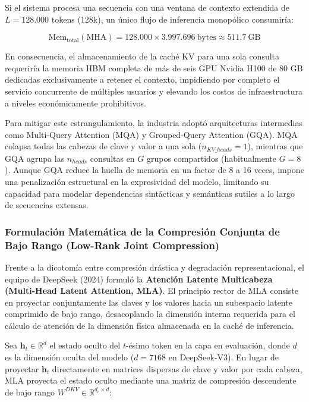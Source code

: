Si el sistema procesa una secuencia con una ventana de contexto extendida de $L = 128.000$ tokens (128k), un único flujo de inferencia monopólico consumiría:

\begin{equation}
\mathrm{Mem}_{\mathrm{total}}(\mathrm{MHA}) = 128.000 \times 3.997.696\ \mathrm{bytes} \approx 511.7\ \mathrm{GB}
\end{equation}

En consecuencia, el almacenamiento de la caché KV para una sola consulta requeriría la memoria HBM completa de más de seis GPU Nvidia H100 de 80 GB dedicadas exclusivamente a retener el contexto, impidiendo por completo el servicio concurrente de múltiples usuarios y elevando los costos de infraestructura a niveles económicamente prohibitivos.

Para mitigar este estrangulamiento, la industria adoptó arquitecturas intermedias como Multi-Query Attention (MQA) y Grouped-Query Attention (GQA). MQA colapsa todas las cabezas de clave y valor a una sola ($n_{KV\_heads} = 1$), mientras que GQA agrupa las $n_{heads}$ consultas en $G$ grupos compartidos (habitualmente $G=8$). Aunque GQA reduce la huella de memoria en un factor de 8 a 16 veces, impone una penalización estructural en la expresividad del modelo, limitando su capacidad para modelar dependencias sintácticas y semánticas sutiles a lo largo de secuencias extensas.

\subsubsection{Formulación Matemática de la Compresión Conjunta de Bajo Rango (Low-Rank Joint Compression)}

Frente a la dicotomía entre compresión drástica y degradación representacional, el equipo de DeepSeek (2024) formuló la \textbf{Atención Latente Multicabeza (Multi-Head Latent Attention, MLA)}. El principio rector de MLA consiste en proyectar conjuntamente las claves y los valores hacia un subespacio latente comprimido de bajo rango, desacoplando la dimensión interna requerida para el cálculo de atención de la dimensión física almacenada en la caché de inferencia.

Sea $\mathbf{h}_t \in \mathbb{R}^d$ el estado oculto del $t$-ésimo token en la capa en evaluación, donde $d$ es la dimensión oculta del modelo ($d = 7168$ en DeepSeek-V3). En lugar de proyectar $\mathbf{h}_t$ directamente en matrices dispersas de clave y valor por cada cabeza, MLA proyecta el estado oculto mediante una matriz de compresión descendente de bajo rango $W^{DKV} \in \mathbb{R}^{d_c \times d}$:

